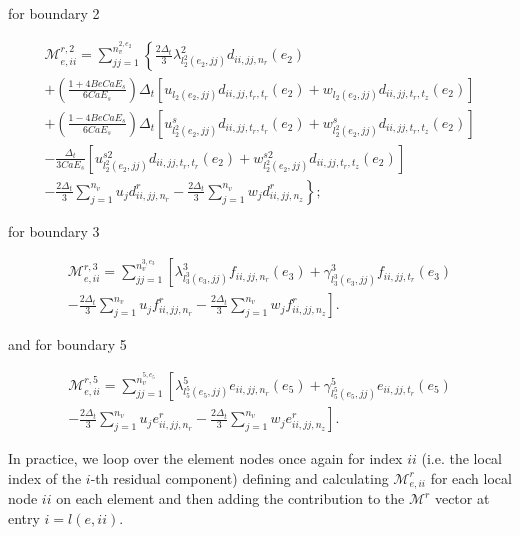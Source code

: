 \documentclass{article}
\begin{document}
for boundary 2

\begin{equation}
\begin{array}{l} \mathcal{M}_{e,ii}^{r,2} = \sum_{jj=1}^{n_v^{2,e_2}} \left\{ \frac{2\Delta_t}{3} \lambda_{l_2^2(e_2,jj)}^2 d_{ii,jj,n_r}(e_2) \right. \\ + \left( \frac{1 + 4Be Ca E_s}{6Ca E_s} \right) \Delta_t \left[ u_{l_2(e_2,jj)} d_{ii,jj,t_r,t_r}(e_2) + w_{l_2(e_2,jj)} d_{ii,jj,t_r,t_z}(e_2) \right] \\ + \left( \frac{1 - 4Be Ca E_s}{6Ca E_s} \right) \Delta_t \left[ u_{l_2^2(e_2,jj)}^s d_{ii,jj,t_r,t_r}(e_2) + w_{l_2^2(e_2,jj)}^s d_{ii,jj,t_r,t_z}(e_2) \right] \\ - \frac{\Delta_t}{3Ca E_s} \left[ u_{l_2^2(e_2,jj)}^{s2} d_{ii,jj,t_r,t_r}(e_2) + w_{l_2^2(e_2,jj)}^{s2} d_{ii,jj,t_r,t_z}(e_2) \right] \\ - \frac{2\Delta_t}{3} \sum_{j=1}^{n_v} u_j d_{ii,jj,n_r}^r - \frac{2\Delta_t}{3} \sum_{j=1}^{n_v} w_j d_{ii,jj,n_z}^r \left. \right\}; \end{array} \tag{4.145}
\end{equation}

for boundary 3

\begin{equation}
\begin{array}{l} \mathcal{M}_{e,ii}^{r,3} = \sum_{jj=1}^{n_v^{3,e_3}} \left[ \lambda_{l_3^3(e_3,jj)}^3 f_{ii,jj,n_r}(e_3) + \gamma_{l_3^3(e_3,jj)}^3 f_{ii,jj,t_r}(e_3) \right. \\ \left. - \frac{2\Delta_t}{3} \sum_{j=1}^{n_v} u_j f_{ii,jj,n_r}^r - \frac{2\Delta_t}{3} \sum_{j=1}^{n_v} w_j f_{ii,jj,n_z}^r \right]. \end{array} \tag{4.146}
\end{equation}

and for boundary 5

\begin{equation}
\begin{array}{l} \mathcal{M}_{e,ii}^{r,5} = \sum_{jj=1}^{n_v^{5,e_5}} \left[ \lambda_{l_5^5(e_5,jj)}^5 e_{ii,jj,n_r}(e_5) + \gamma_{l_5^5(e_5,jj)}^5 e_{ii,jj,t_r}(e_5) \right. \\ \left. - \frac{2\Delta_t}{3} \sum_{j=1}^{n_v} u_j e_{ii,jj,n_r}^r - \frac{2\Delta_t}{3} \sum_{j=1}^{n_v} w_j e_{ii,jj,n_z}^r \right]. \end{array} \tag{4.147}
\end{equation}

In practice, we loop over the element nodes once again for index \(ii\) (i.e. the local index of the \(i\)-th residual component) defining and calculating \(\mathcal{M}_{e,ii}^r\) for each local node \(ii\) on each element and then adding the contribution to the \(\mathcal{M}^r\) vector at entry \(i = l(e,ii)\).
\end{document}
